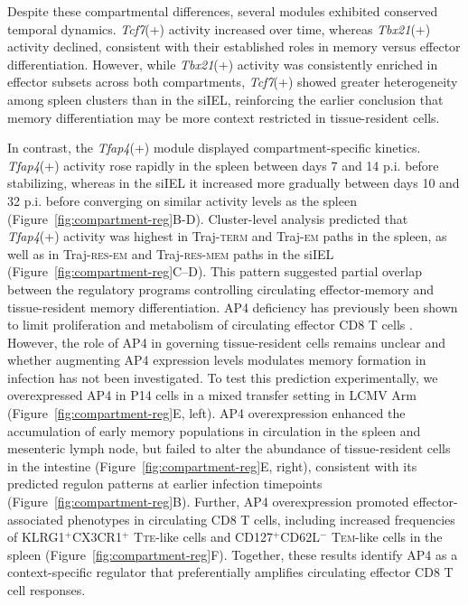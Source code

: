 Despite these compartmental differences, several modules exhibited conserved temporal dynamics. \emph{Tcf7}(+) activity increased over time, whereas \emph{Tbx21}(+) activity declined, consistent with their established roles in memory versus effector differentiation. However, while \emph{Tbx21}(+) activity was consistently enriched in effector subsets across both compartments, \emph{Tcf7}(+) showed greater heterogeneity among spleen clusters than in the siIEL, reinforcing the earlier conclusion that memory differentiation may be more context restricted in tissue-resident cells.

In contrast, the \emph{Tfap4}(+) module displayed compartment-specific kinetics. \emph{Tfap4}(+) activity rose rapidly in the spleen between days 7 and 14 p.i. before stabilizing, whereas in the siIEL it increased more gradually between days 10 and 32 p.i. before converging on similar activity levels as the spleen (Figure~\ref{fig:compartment-reg}B-D). Cluster-level analysis predicted that \emph{Tfap4}(+) activity was highest in Traj-\textsc{term} and Traj-\textsc{em} paths in the spleen, as well as in Traj-\textsc{res-em} and Traj-\textsc{res-mem} paths in the siIEL (Figure~\ref{fig:compartment-reg}C--D). This pattern suggested partial overlap between the regulatory programs controlling circulating effector-memory and tissue-resident memory differentiation. AP4 deficiency has previously been shown to limit proliferation and metabolism of circulating effector CD8 T cells \citep{chouTranscriptionFactorAP42016}. However, the role of AP4 in governing tissue-resident cells remains unclear and whether augmenting AP4 expression levels modulates memory formation in infection has not been investigated. To test this prediction experimentally, we overexpressed AP4 in P14 cells in a mixed transfer setting in LCMV Arm (Figure~\ref{fig:compartment-reg}E, left). AP4 overexpression enhanced the accumulation of early memory populations in circulation in the spleen and mesenteric lymph node, but failed to alter the abundance of tissue-resident cells in the intestine (Figure~\ref{fig:compartment-reg}E, right), consistent with its predicted regulon patterns at earlier infection timepoints (Figure~\ref{fig:compartment-reg}B). Further, AP4 overexpression promoted effector-associated phenotypes in circulating CD8 T cells, including increased frequencies of KLRG1$^{+}$CX3CR1$^{+}$ T\textsc{te-}like cells and CD127$^{+}$CD62L$^{-}$ T\textsc{em}-like cells in the spleen (Figure~\ref{fig:compartment-reg}F). Together, these results identify AP4 as a context-specific regulator that preferentially amplifies circulating effector CD8 T cell responses.

